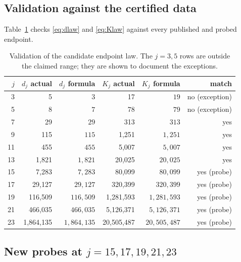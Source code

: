 \documentclass[11pt]{article}
\theoremstyle{remark}
\begin{document}
\subsection{Validation against the certified data}

Table~\ref{tab:validation} checks \eqref{eq:dlaw} and \eqref{eq:Klaw} against every published and probed endpoint.

\begin{table}[h]
\centering
\small
\caption{Validation of the candidate endpoint law. The \(j=3,5\) rows are outside the claimed range; they are shown to document the exceptions.}
\label{tab:validation}
\begin{tabular}{rrrrrr}
\toprule
\(j\) & \(d_j\) actual & \(d_j\) formula & \(K_j\) actual & \(K_j\) formula & match\\
\midrule
3 & 5 & \(3\) & 17 & \(19\) & no (exception)\\
5 & 8 & \(7\) & 78 & \(79\) & no (exception)\\
7 & 29 & \(29\) & 313 & \(313\) & yes\\
9 & 115 & \(115\) & 1{,}251 & \(1{,}251\) & yes\\
11 & 455 & \(455\) & 5{,}007 & \(5{,}007\) & yes\\
13 & 1{,}821 & \(1{,}821\) & 20{,}025 & \(20{,}025\) & yes\\
15 & 7{,}283 & \(7{,}283\) & 80{,}099 & \(80{,}099\) & yes (probe)\\
17 & 29{,}127 & \(29{,}127\) & 320{,}399 & \(320{,}399\) & yes (probe)\\
19 & 116{,}509 & \(116{,}509\) & 1{,}281{,}593 & \(1{,}281{,}593\) & yes (probe)\\
21 & 466{,}035 & \(466{,}035\) & 5{,}126{,}371 & \(5{,}126{,}371\) & yes (probe)\\
23 & 1{,}864{,}135 & \(1{,}864{,}135\) & 20{,}505{,}487 & \(20{,}505{,}487\) & yes (probe)\\
\bottomrule
\end{tabular}
\end{table}

\subsection{New probes at \(j=15,17,19,21,23\)}
\end{document}

